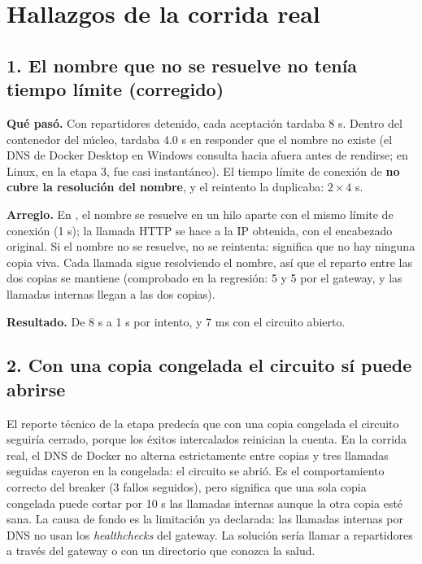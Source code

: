 \documentclass[11pt]{article}
\begin{document}
\section{Hallazgos de la corrida real}\label{sec:hallazgos}

\subsection{1. El nombre que no se resuelve no tenía tiempo límite (corregido)}

\textbf{Qué pasó.} Con repartidores detenido, cada aceptación tardaba 8 s. Dentro del contenedor del
núcleo,  tardaba 4.0 s en responder que el nombre no existe (el
DNS de Docker Desktop en Windows consulta hacia afuera antes de rendirse; en Linux, en la etapa 3, fue
casi instantáneo). El tiempo límite de conexión de  \textbf{no cubre la resolución del
nombre}, y el reintento la duplicaba: $2 \times 4$ s.

\textbf{Arreglo.} En , el nombre se resuelve en un hilo aparte con el
mismo límite de conexión (1 s); la llamada HTTP se hace a la IP obtenida, con el encabezado 
original. Si el nombre no se resuelve, no se reintenta: significa que no hay ninguna copia viva. Cada
llamada sigue resolviendo el nombre, así que el reparto entre las dos copias se mantiene (comprobado en
la regresión: 5 y 5 por el gateway, y las llamadas internas llegan a las dos copias).

\textbf{Resultado.} De 8 s a 1 s por intento, y 7 ms con el circuito abierto.

\subsection{2. Con una copia congelada el circuito sí puede abrirse}

El reporte técnico de la etapa predecía que con una copia congelada el circuito seguiría cerrado,
porque los éxitos intercalados reinician la cuenta. En la corrida real, el DNS de Docker no alterna
estrictamente entre copias y tres llamadas seguidas cayeron en la congelada: el circuito se abrió. Es el
comportamiento correcto del breaker (3 fallos seguidos), pero significa que una sola copia congelada
puede cortar por 10 s las llamadas internas aunque la otra copia esté sana. La causa de fondo es la
limitación ya declarada: las llamadas internas por DNS no usan los \emph{healthchecks} del gateway. La
solución sería llamar a repartidores a través del gateway o con un directorio que conozca la salud.
\end{document}
